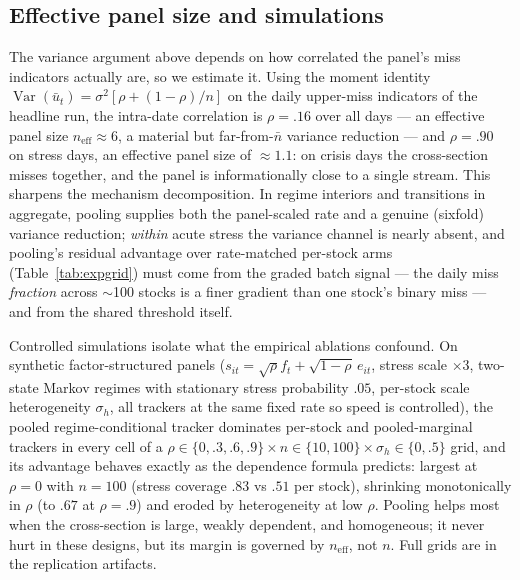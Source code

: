 \subsection{Effective panel size and simulations}
\label{sec:mechanism-sims}

The variance argument above depends on how correlated the panel's miss
indicators actually are, so we estimate it. Using the moment identity
$\operatorname{Var}(\bar u_t) = \sigma^2[\rho + (1-\rho)/n]$ on the
daily upper-miss indicators of the headline run, the intra-date
correlation is $\rho = .16$ over all days --- an effective panel size
$n_{\mathrm{eff}} \approx 6$, a material but far-from-$\bar n$
variance reduction --- and $\rho = .90$ on stress days, an effective
panel size of $\approx 1.1$: on crisis days the cross-section misses
together, and the panel is informationally close to a single stream.
This sharpens the mechanism decomposition. In regime interiors and
transitions in aggregate, pooling supplies both the panel-scaled rate
and a genuine (sixfold) variance reduction; \emph{within} acute stress
the variance channel is nearly absent, and pooling's residual advantage
over rate-matched per-stock arms (Table~\ref{tab:expgrid}) must come
from the graded batch signal --- the daily miss \emph{fraction} across
$\sim$100 stocks is a finer gradient than one stock's binary miss ---
and from the shared threshold itself.

Controlled simulations isolate what the empirical ablations confound.
On synthetic factor-structured panels ($s_{it} = \sqrt{\rho} f_t +
\sqrt{1-\rho}\, e_{it}$, stress scale $\times 3$, two-state Markov
regimes with stationary stress probability $.05$, per-stock scale
heterogeneity $\sigma_h$, all trackers at the same fixed rate so speed
is controlled), the pooled regime-conditional tracker dominates
per-stock and pooled-marginal trackers in every cell of a $\rho \in
\{0, .3, .6, .9\} \times n \in \{10, 100\} \times \sigma_h \in
\{0, .5\}$ grid, and its advantage behaves exactly as the dependence
formula predicts: largest at $\rho = 0$ with $n = 100$ (stress
coverage $.83$ vs $.51$ per stock), shrinking monotonically in $\rho$
(to $.67$ at $\rho = .9$) and eroded by heterogeneity at low $\rho$.
Pooling helps most when the cross-section is large, weakly dependent,
and homogeneous; it never hurt in these designs, but its margin is
governed by $n_{\mathrm{eff}}$, not $n$. Full grids are in the
replication artifacts.


